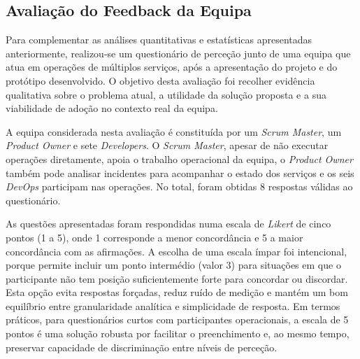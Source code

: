	\subsection{Avaliação do Feedback da Equipa}
	
		
		
		
		
		
		Para complementar as análises quantitativas e estatísticas apresentadas anteriormente, realizou-se um questionário de perceção junto de uma equipa que atua em operações de múltiplos serviços, após a apresentação do projeto e do protótipo desenvolvido. O objetivo desta avaliação foi recolher evidência qualitativa sobre o problema atual, a utilidade da solução proposta e a sua viabilidade de adoção no contexto real da equipa.
		
		A equipa considerada nesta avaliação é constituída por um \textit{Scrum Master}, um \textit{Product Owner} e sete \textit{Developers}. O \textit{Scrum Master}, apesar de não executar operações diretamente, apoia o trabalho operacional da equipa, o \textit{Product Owner} também pode analisar incidentes para acompanhar o estado dos serviços e os seis \textit{DevOps} participam nas operações. No total, foram obtidas 8 respostas válidas ao questionário.
		
		As questões apresentadas foram respondidas numa escala de \textit{Likert} de cinco pontos (1 a 5), onde 1 corresponde a menor concordância e 5 a maior concordância com as afirmações. A escolha de uma escala ímpar foi intencional, porque permite incluir um ponto intermédio (valor 3) para situações em que o participante não tem posição suficientemente forte para concordar ou discordar. Esta opção evita respostas forçadas, reduz ruído de medição e mantém um bom equilíbrio entre granularidade analítica e simplicidade de resposta. Em termos práticos, para questionários curtos com participantes operacionais, a escala de 5 pontos é uma solução robusta por facilitar o preenchimento e, ao mesmo tempo, preservar capacidade de discriminação entre níveis de perceção.
		
